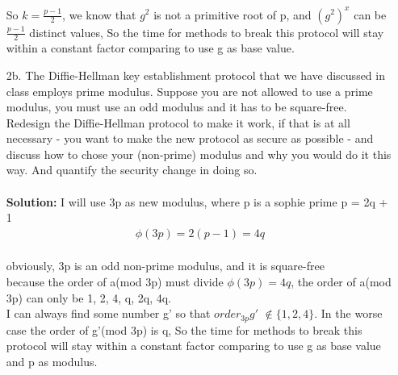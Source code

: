 \documentclass[12pt,letterpaper]{article}
\begin{document}
\begin{enumerate}
    So $k = \frac{p-1}{2}$, we know that $g^2$ is not a primitive root of p, and $(g^2)^x$ can be $\frac{p-1}{2}$ distinct values, So the time for methods to break this protocol will stay within a constant factor comparing to use g as base value.
  \item[2b.]
  The Diffie-Hellman key establishment protocol that we have discussed in class employs prime modulus. Suppose you are not allowed to use a prime modulus, you must use an odd modulus and it has to be square-free. Redesign the Diffie-Hellman protocol to make it work, if that is at all necessary - you want to make the new protocol as secure as possible - and discuss how to chose your (non-prime) modulus and why you would do it this way. And quantify the security change in doing so. \\ \\
  \textbf{Solution:} I will use 3p as new modulus, where p is a sophie prime p = 2q + 1 \\
  \begin{align*}
    \phi{(3p)} = 2(p - 1) = 4q
  \end{align*} \\
  obviously, 3p is an odd non-prime modulus, and it is square-free \\
  because the order of a(mod 3p) must divide $\phi{(3p)} = 4q$, the order of a(mod 3p) can only be 1, 2, 4, q, 2q, 4q. \\
  I can always find some number g' so that $order_{3p}g'$ $\notin \{1,2,4\}$.  In the worse case the order of g'(mod 3p) is q, So the time for methods to break this protocol will stay within a constant factor comparing to use g as base value and p as modulus.   

\end{enumerate}
\end{document}
